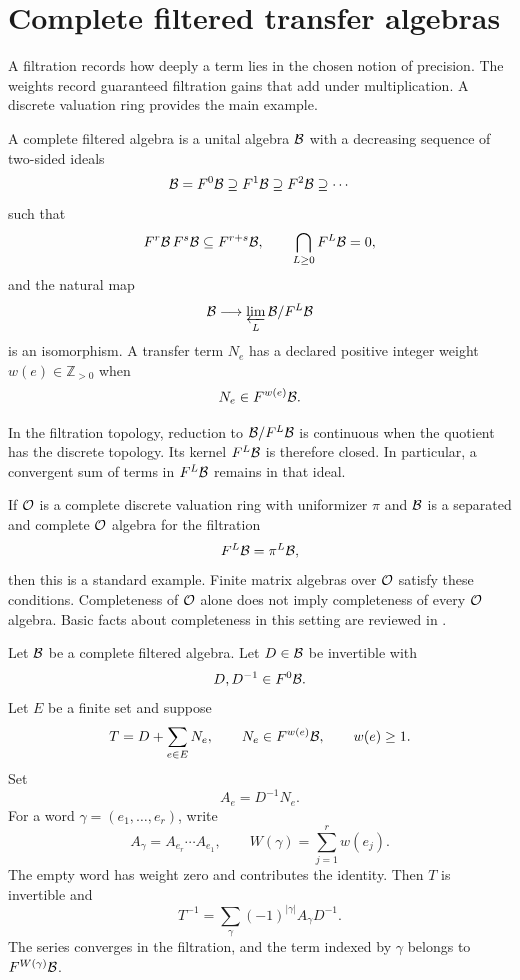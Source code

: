 \section{Complete filtered transfer algebras}\label{sec:filtered}

A filtration records how deeply a term lies in the chosen notion of precision. The weights record guaranteed filtration gains that add under multiplication. A discrete valuation ring provides the main example.

\begin{definition}\label{def:filtered_algebra}
A complete filtered algebra is a unital algebra $\mathcal B$ with a decreasing sequence of two-sided ideals
\[
\mathcal B=F^0\mathcal B\supseteq F^1\mathcal B\supseteq F^2\mathcal B\supseteq\cdots
\]
such that
\[
F^r\mathcal B\,F^s\mathcal B\subseteq F^{r+s}\mathcal B,
\qquad
\bigcap_{L\geq0}F^L\mathcal B=0,
\]
and the natural map
\[
\mathcal B\longrightarrow\varprojlim_L\mathcal B/F^L\mathcal B
\]
is an isomorphism.  A transfer term $N_e$ has a declared positive integer weight $w(e)\in\mathbb Z_{>0}$ when
\[
N_e\in F^{w(e)}\mathcal B.
\]
\end{definition}

In the filtration topology, reduction to $\mathcal B/F^L\mathcal B$ is continuous when the quotient has the discrete topology. Its kernel $F^L\mathcal B$ is therefore closed. In particular, a convergent sum of terms in $F^L\mathcal B$ remains in that ideal.

If ${\mathcal O}$ is a complete discrete valuation ring with uniformizer $\pi$ and $\mathcal B$ is a separated and complete ${\mathcal O}$ algebra for the filtration
\[
F^L\mathcal B=\pi^L\mathcal B,
\]
then this is a standard example. Finite matrix algebras over ${\mathcal O}$ satisfy these conditions. Completeness of ${\mathcal O}$ alone does not imply completeness of every ${\mathcal O}$ algebra. Basic facts about completeness in this setting are reviewed in \cite{Serre1979}.

\begin{theorem}\label{thm:weighted_inverse}
Let $\mathcal B$ be a complete filtered algebra.  Let $D\in\mathcal B$ be invertible with
\[
D,D^{-1}\in F^0\mathcal B.
\]
Let $E$ be a finite set and suppose
\[
T=D+\sum_{e\in E}N_e,
\qquad
N_e\in F^{w(e)}\mathcal B,
\qquad
w(e)\geq1.
\]
Set
\[
A_e=D^{-1}N_e.
\]
For a word $\gamma=(e_1,\ldots,e_r)$, write
\[
A_\gamma=A_{e_r}\cdots A_{e_1},
\qquad
W(\gamma)=\sum_{j=1}^rw(e_j).
\]
The empty word has weight zero and contributes the identity.  Then $T$ is invertible and
\[
T^{-1}
=
\sum_\gamma(-1)^{|\gamma|}A_\gamma D^{-1}.
\]
The series converges in the filtration, and the term indexed by $\gamma$ belongs to $F^{W(\gamma)}\mathcal B$.
\end{theorem}

